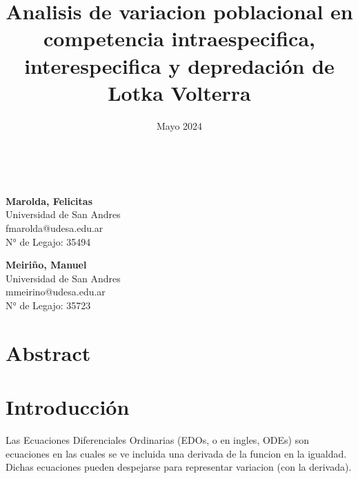 \documentclass{article}
\title {Analisis de variacion poblacional en competencia intraespecifica, interespecifica y depredación de Lotka Volterra}
\date{Mayo 2024}
\makeatletter
\renewcommand{\maketitle}{
    \begin{center}
        {\huge \@title}\\
        \vspace{10pt} 
        {\Large \@date}
    \end{center}
}
\makeatother
\begin{document}

\maketitle
\thispagestyle{plain}

\begin{center}

\large
\textbf{Marolda, Felicitas}\\
Universidad de San Andres\\
fmarolda@udesa.edu.ar\\
N° de Legajo: 35494\\
\vspace{1\baselineskip}

\large
\textbf{Meiriño, Manuel}\\
Universidad de San Andres\\
mmeirino@udesa.edu.ar\\
N° de Legajo: 35723
\end{center}

\vspace{0.5cm}

\section*{Abstract}
\normalsize


\vspace{1\baselineskip}





\section*{Introducción}

\noindent 

 
 \noindent 
Las Ecuaciones Diferenciales Ordinarias (EDOs, o en ingles, ODEs) son ecuaciones en las cuales se ve incluida una derivada de la funcion en la igualdad. Dichas ecuaciones pueden despejarse para representar variacion (con la derivada). \vspace{\baselineskip}
\end{document}
